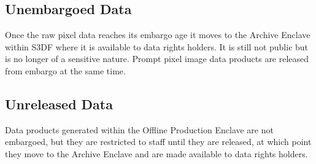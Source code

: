 \subsection{Unembargoed Data}
Once the raw pixel data reaches its embargo age it moves to the Archive \gls{Enclave} within \gls{S3DF} where it is available to data rights holders. It is still not public but is no longer of a sensitive nature.
Prompt pixel image data products are released from embargo at the same time.

\subsection{Unreleased Data}
Data products generated within the Offline Production \gls{Enclave} are not embargoed, but they are restricted to staff until they are released, at which point they move to the Archive \gls{Enclave} and are made available to data rights holders.
